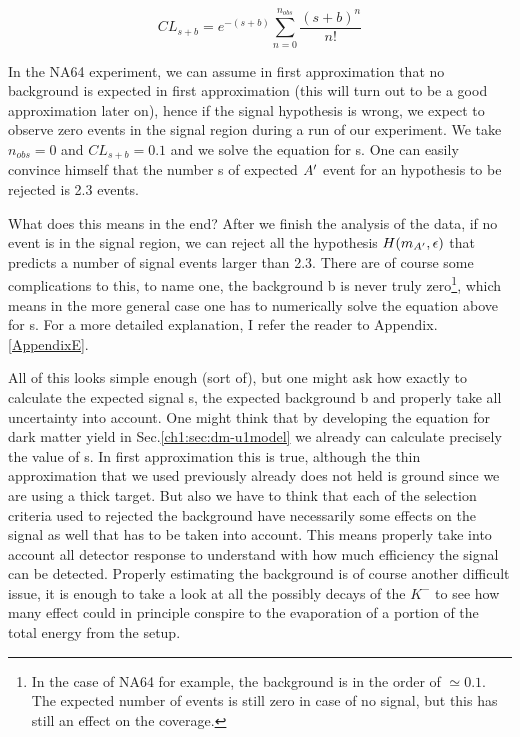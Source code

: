 \begin{equation}
  \label{eq:confidence-level-poisson}
  CL_{s+b} = e^{-(s+b)}\sum^{n_{obs}}_{n=0} \frac{(s+b)^n}{n!}
\end{equation}

In the NA64 experiment, we can assume in first approximation that no background is expected in first approximation (this will turn out to be a good approximation later on), hence if the signal hypothesis is wrong, we expect to observe zero events in the signal region during a run of our experiment. We take $n_{obs} = 0$ and $CL_{s+b} = 0.1$ and we solve the equation for s. One can easily convince himself that the number s of expected $A'$ event for an hypothesis to be rejected is 2.3 events.

What does this means in the end? After we finish the analysis of the data, if no event is in the signal region, we can reject all the hypothesis $H(m_{A'}, \epsilon)$ that predicts a number of signal events larger than 2.3. There are of course some complications to this, to name one, the background b is never truly zero\footnote{In the case of NA64 for example, the background is in the order of $\simeq0.1$. The expected number of events is still zero in case of no signal, but this has still an effect on the coverage.}, which means in the more general case one has to numerically solve the equation above for s. For a more detailed explanation, I refer the reader to Appendix.\ref{AppendixE}.

All of this looks simple enough (sort of), but one might ask how exactly to calculate the expected signal s, the expected background b and properly take all uncertainty into account. One might think that by developing the equation for dark matter yield in Sec.\ref{ch1:sec:dm-u1model} we already can calculate precisely the value of s. In first approximation this is true, although the thin approximation that we used previously already does not held is ground since we are using a thick target. But also we have to think that each of the selection criteria used to rejected the background have necessarily some effects on the signal as well that has to be taken into account. This means properly take into account all detector response to understand with how much efficiency the signal can be detected. Properly estimating the background is of course another difficult issue, it is enough to take a look at all the possibly decays of the $K^-$\cite{particle-strange-mesons} to see how many effect could in principle conspire to the evaporation of a portion of the total energy from the setup.

